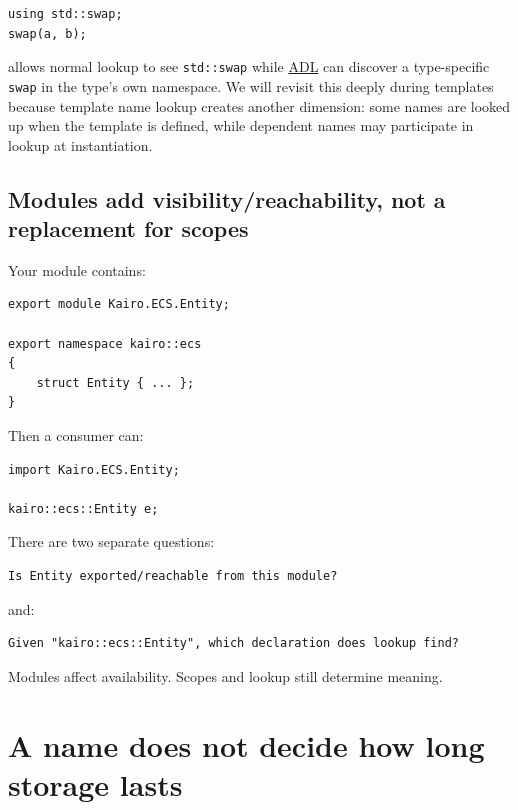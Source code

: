 \begin{verbatim}
using std::swap;
swap(a, b);
\end{verbatim}

allows normal lookup to see \texttt{std::swap} while \hyperref[appendix-7863714aa97f]{ADL} can discover a type-specific \texttt{swap} in the type's own namespace. We will revisit this deeply during templates because template name lookup creates another dimension: some names are looked up when the template is defined, while dependent names may participate in lookup at instantiation.

\subsection{Modules add visibility/reachability, not a replacement for scopes}\label{05-engine-i-ch002-modules-add-visibilityreachability-not-a-replacement-for-scopes}

Your module contains:

\begin{verbatim}
export module Kairo.ECS.Entity;

export namespace kairo::ecs
{
    struct Entity { ... };
}
\end{verbatim}

Then a consumer can:

\begin{verbatim}
import Kairo.ECS.Entity;

kairo::ecs::Entity e;
\end{verbatim}

There are two separate questions:

\begin{verbatim}
Is Entity exported/reachable from this module?
\end{verbatim}

and:

\begin{verbatim}
Given "kairo::ecs::Entity", which declaration does lookup find?
\end{verbatim}

Modules affect availability. Scopes and lookup still determine meaning.

\section{A name does not decide how long storage lasts}\label{05-engine-i-ch002-a-name-does-not-decide-how-long-storage-lasts}

